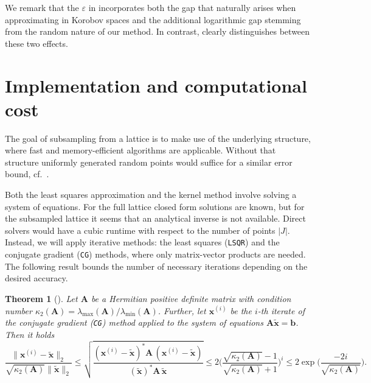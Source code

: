 \documentclass[a4paper]{amsart}
\newtheorem{theorem}{Theorem}[section]
\begin{document}
We remark that the $\varepsilon$ in  incorporates both the gap that naturally arises when approximating in Korobov spaces and the additional logarithmic gap stemming from the random nature of our method.
In contrast,  clearly distinguishes between these two effects.
 \section{Implementation and computational cost}\label{sec:implementation} 

The goal of subsampling from a lattice is to make use of the underlying structure, where fast and memory-efficient algorithms are applicable.
Without that structure uniformly generated random points would suffice for a similar error bound, cf.\ \cite{KU20, KUV21}.

Both the least squares approximation and the kernel method involve solving a system of equations.
For the full lattice closed form solutions are known, but for the subsampled lattice it seems that an analytical inverse is not available.
Direct solvers would have a cubic runtime with respect to the number of points $|J|$.
Instead, we will apply iterative methods: the least squares (\texttt{LSQR}) \cite{PS82} and the conjugate gradient (\texttt{CG}) \cite{Gre97} methods, where only matrix-vector products are needed.
The following result bounds the number of necessary iterations depending on the desired accuracy.

\begin{theorem}[{\cite[Theorem~3.1.1]{Gre97}}]\label{iterations} Let $\bm A$ be a Hermitian positive definite matrix with condition number $\kappa_2(\bm A) = \lambda_{\max}(\bm A)/\lambda_{\min}(\bm A)$.
    Further, let $\bm x^{(i)}$ be the $i$-th iterate of the conjugate gradient (\texttt{CG}) method applied to the system of equations $\bm A\bm{\tilde x} = \bm b$.
    Then it holds
    \begin{equation*}
        \frac{\|\bm x^{(i)} - \bm{\tilde x}\|_2}{\sqrt{\kappa_2(\bm A)}\|\bm{\tilde x}\|_2}
        \le \! \sqrt{\frac{(\bm x^{(i)}-\bm{\tilde x})^\ast \bm A \, (\bm x^{(i)}-\bm{\tilde x})}{(\bm{\tilde x})^\ast \bm A \, \bm{\tilde x}}}
        \!\le 2 \Big(\frac{\sqrt{\kappa_2(\bm A)} - 1}{\sqrt{\kappa_2(\bm A)} + 1}\Big)^i
        \!\le 2 \exp\Big(\!\frac{-2i}{\sqrt{\kappa_2(\bm A)}}\Big) .
    \end{equation*}
\end{theorem} 
\end{document}
